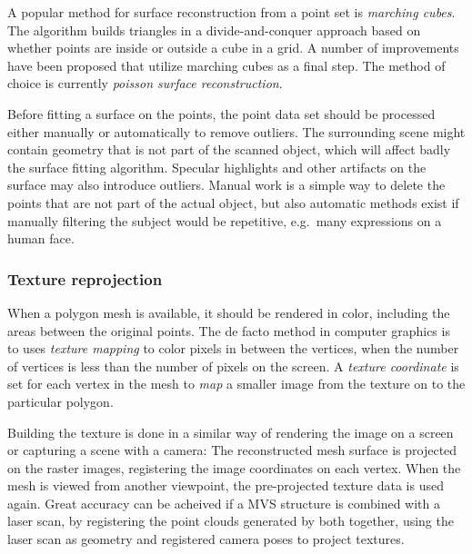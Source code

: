 A popular method for surface reconstruction from a point set is \emph{marching cubes}. \cite{lorensen1987marching}
The algorithm builds triangles in a divide-and-conquer approach based on whether points are inside or outside a cube in a grid.
A number of improvements have been proposed that utilize marching cubes as a final step.
The method of choice is currently \emph{poisson surface reconstruction}. \cite{kazhdan2006poisson,kazhdan2013screened}

Before fitting a surface on the points, the point data set should be processed either manually or automatically to remove outliers.
The surrounding scene might contain geometry that is not part of the scanned object, which will affect badly the surface fitting algorithm.
Specular highlights and other artifacts on the surface may also introduce outliers.
Manual work is a simple way to delete the points that are not part of the actual object, but also automatic methods exist if manually filtering the subject would be repetitive, e.g.\ many expressions on a human face.



\subsubsection{Texture reprojection} %

When a polygon mesh is available, it should be rendered in color, including the areas between the original points.
The de facto method in computer graphics is to uses \emph{texture mapping} to color pixels in between the vertices, when the number of vertices is less than the number of pixels on the screen.
A \emph{texture coordinate} is set for each vertex in the mesh to \emph{map} a smaller image from the texture on to the particular polygon. \cite{heckbert1986survey}

Building the texture is done in a similar way of rendering the image on a screen or capturing a scene with a camera:
The reconstructed mesh surface is projected on the raster images, registering the image coordinates on each vertex. \cite[p. 610]{szeliski10vision} \cite[p. 98]{heyden2005multiple}
When the mesh is viewed from another viewpoint, the pre-projected texture data is used again.
Great accuracy can be acheived if a MVS structure is combined with a laser scan, by registering the point clouds generated by both together, using the laser scan as geometry and registered camera poses to project textures. \cite{liu2006multiview}

